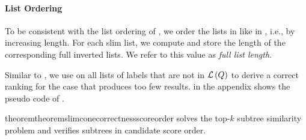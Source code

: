 \paragraph{List Ordering}

To be consistent with the list ordering of \cone{}, we order the lists in \shincone{} like in \cone{}, i.e., by increasing length. For each slim list, we compute and store the length of the corresponding full inverted lists. We refer to this value as \emph{full list length}.

\medskip

Similar to \cone{}, we use \lowerboundmerge{} on all lists of labels that are not in $\mathcal{L} \left( Q \right)$ to derive a correct ranking for the case that \shincone{} produces too few results.  in the appendix shows the pseudo code of \shincone{}.

\begin{restatable}{theorem}{theoremslimconecorrectnessscoreorder}
\shincone{} solves the top-$k$ subtree similarity problem and verifies subtrees in candidate score order.
\end{restatable}

